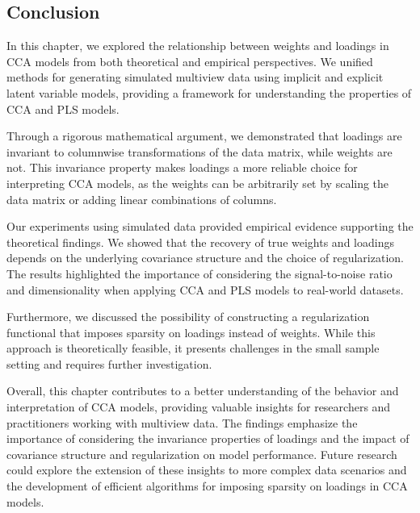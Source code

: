 \subsection{Conclusion}

In this chapter, we explored the relationship between weights and loadings in CCA models from both theoretical and empirical perspectives. We unified methods for generating simulated multiview data using implicit and explicit latent variable models, providing a framework for understanding the properties of CCA and PLS models.

Through a rigorous mathematical argument, we demonstrated that loadings are invariant to columnwise transformations of the data matrix, while weights are not. This invariance property makes loadings a more reliable choice for interpreting CCA models, as the weights can be arbitrarily set by scaling the data matrix or adding linear combinations of columns.

Our experiments using simulated data provided empirical evidence supporting the theoretical findings. We showed that the recovery of true weights and loadings depends on the underlying covariance structure and the choice of regularization. The results highlighted the importance of considering the signal-to-noise ratio and dimensionality when applying CCA and PLS models to real-world datasets.

Furthermore, we discussed the possibility of constructing a regularization functional that imposes sparsity on loadings instead of weights. While this approach is theoretically feasible, it presents challenges in the small sample setting and requires further investigation.

Overall, this chapter contributes to a better understanding of the behavior and interpretation of CCA models, providing valuable insights for researchers and practitioners working with multiview data. The findings emphasize the importance of considering the invariance properties of loadings and the impact of covariance structure and regularization on model performance. Future research could explore the extension of these insights to more complex data scenarios and the development of efficient algorithms for imposing sparsity on loadings in CCA models.